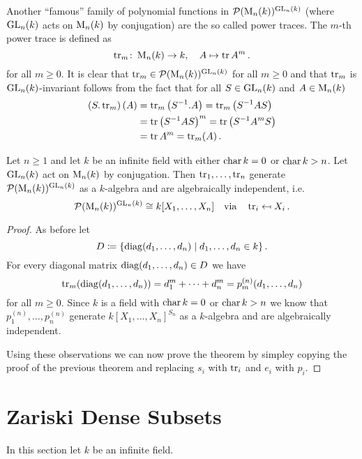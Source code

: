 Another ``famous'' family of polynomial functions in $\mathcal{P}(\operatorname{M}_n(k))^{\operatorname{GL}_n(k)}$ (where $\operatorname{GL}_n(k)$ acts on $\operatorname{M}_n(k)$ by conjugation) are the so called power traces.
The $m$-th power trace is defined as
\[
          \operatorname{tr}_m
  \colon  \operatorname{M}_n(k)
  \to     k,
 \quad    A
  \mapsto \operatorname{tr} A^m \,.
\]
for all $m \geq 0$.
It is clear that $\operatorname{tr}_m \in \mathcal{P}(\operatorname{M}_n(k))^{\operatorname{GL}_n(k)}$ for all $m \geq 0$ and that $\operatorname{tr}_m$ is $\operatorname{GL}_n(k)$-invariant follows from the fact that for all $S \in \operatorname{GL}_n(k)$ and $A \in \operatorname{M}_n(k)$
\begin{align*}
      \left( S.\operatorname{tr}_m \right)(A)
  &=  \operatorname{tr}_m\left( S^{-1}.A \right)
   =  \operatorname{tr}_m\left( S^{-1} A S \right)  \\
  &=  \operatorname{tr} \left( S^{-1} A S \right)^m
   =  \operatorname{tr} \left( S^{-1} A^m S \right) \\
  &=  \operatorname{tr} A^m
   =  \operatorname{tr}_m(A) \,.
\end{align*}


\begin{theorem}
  Let $n \geq 1$ and let $k$ be an infinite field with either $\operatorname{char} k = 0$ or $\operatorname{char} k > n$.
  Let $\operatorname{GL}_n(k)$ act on $\operatorname{M}_n(k)$ by conjugation.
  Then $\operatorname{tr}_1, \dotsc, \operatorname{tr}_n$ generate $\mathcal{P}(\operatorname{M}_n(k))^{\operatorname{GL}_n(k)}$ as a $k$-algebra and are algebraically independent, i.e.\
  \[
          \mathcal{P}(\operatorname{M}_n(k))^{\operatorname{GL}_n(k)}
    \cong k[X_1, \dotsc, X_n]
    \quad\text{via}\quad
              \operatorname{tr}_i
    \mapsfrom X_i \,.
  \]
\end{theorem}
\begin{proof}
  As before let 
  \[
              D
    \coloneqq \{
                \operatorname{diag}(d_1, \dotsc, d_n)
              \mid
                    d_1, \dotsc, d_n
                \in k
              \} \,.
  \]
  For every diagonal matrix $\operatorname{diag}(d_1, \dotsc, d_n) \in D$ we have
  \[
      \operatorname{tr}_m( \operatorname{diag}(d_1, \dotsc, d_n) )
    = d_1^m + \dotsb + d_n^m
    = p^{(n)}_m(d_1, \dotsc, d_n)
  \]
  for all $m \geq 0$.
  Since $k$ is a field with $\operatorname{char} k = 0$ or $\operatorname{char} k > n$ we know that $p^{(n)}_1, \dotsc, p^{(n)}_n$ generate $k[X_1, \dotsc, X_n]^{S_n}$ as a $k$-algebra and are algebraically independent.
  
  Using these observations we can now prove the theorem by simpley copying the proof of the previous theorem and replacing $s_i$ with $\operatorname{tr}_i$ and $e_i$ with $p_i$.
\end{proof}





\section{Zariski Dense Subsets}
In this section let $k$ be an infinite field.


